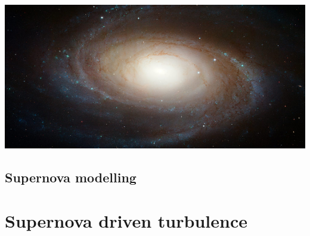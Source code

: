 \documentclass{beamer}
\author{ 
        {\footnotesize
         {Frederick Gent \inst{1,2}\vspace{1.5cm}
}}}
\title{\color{white}{Simulations of the interstellar medium, cosmic rays and magnetic fields\vspace{2.0cm}
}}
\date{\color{white}\today -- Towards a comprehensive model of the galactic magnetic field}
\institute{\tiny{\color{white}
{$^1$ReSoLVE, Department of Computer Science, Aalto University, Espoo, Finland
\and
$^2$Department of Mathematics, Newcastle  University, Newcastle upon Tyne, UK
}}}
\begin{document}
  {
  \usebackgroundtemplate
    {\hspace{-2.75cm}\vspace{-7.5cm}
     \includegraphics [width=1.35\paperwidth,height=\paperheight]
    {hs-2007-19_M81b.png} }
    \begin{frame}
      \maketitle%
    \end{frame}
  }

%
%

  \subsection{Supernova modelling}

  \section{Supernova driven turbulence}
\end{document}

